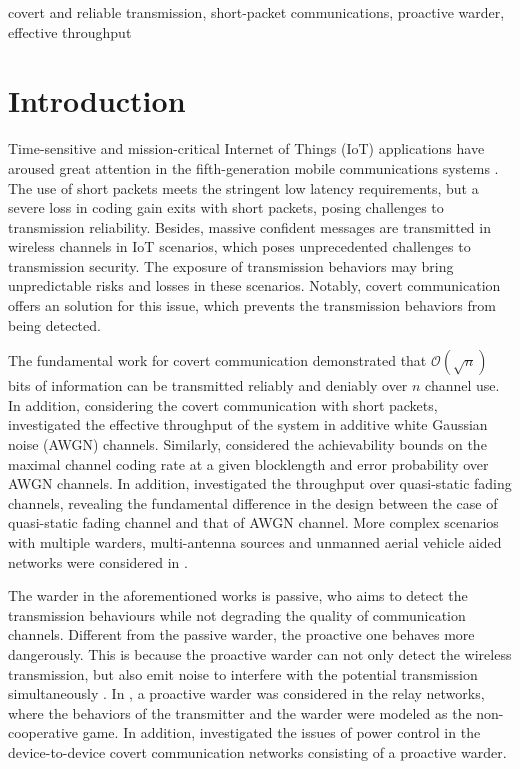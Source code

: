 \documentclass[conference]{IEEEtran}
\begin{document}
\begin{IEEEkeywords}
covert and reliable transmission, short-packet communications, proactive warder, effective throughput
\end{IEEEkeywords}

\section{Introduction}
Time-sensitive and mission-critical Internet of Things (IoT) applications have aroused great attention in the fifth-generation mobile communications systems \cite{Intro_short}. The use of short packets meets the stringent low latency requirements, but a severe loss in coding gain exits with short packets, posing challenges to transmission reliability. Besides, massive confident messages are transmitted in wireless channels in IoT scenarios, which poses unprecedented challenges to transmission security. The exposure of transmission behaviors may bring unpredictable risks and losses in these scenarios. Notably, covert communication offers an solution for this issue, which prevents the transmission behaviors from being detected\cite{Covert}.

The fundamental work for covert communication \cite{Covert} demonstrated that $\mathcal{O}(\sqrt{n})$ bits of information can be transmitted reliably and deniably over $n$ channel use. In addition, considering the covert communication with short packets, \cite{Gaussian} investigated the effective throughput of the system in additive white Gaussian noise (AWGN) channels. Similarly, \cite{AWGN3} considered the achievability bounds on the maximal channel coding rate at a given blocklength and error probability over AWGN channels. In addition, \cite{Fading3,Nmin} investigated the throughput over quasi-static fading channels, revealing the fundamental difference in the design between the case of quasi-static fading channel and that of AWGN channel. More complex scenarios with multiple warders, multi-antenna sources and unmanned aerial vehicle aided networks were considered in \cite{ECT2,Fading4,UAV}.

The warder in the aforementioned works is passive, who aims to detect the transmission behaviours while not degrading the quality of communication channels. Different from the passive warder, the proactive one behaves more dangerously. This is because the proactive warder can not only detect the wireless transmission, but also emit noise to interfere with the potential transmission simultaneously \cite{Active1}. In \cite{Active2}, a proactive warder was considered in the relay networks, where the behaviors of the transmitter and the warder were modeled as the non-cooperative game. In addition, \cite{Active3} investigated the issues of power control in the device-to-device covert communication networks consisting of a proactive warder.
\end{document}
